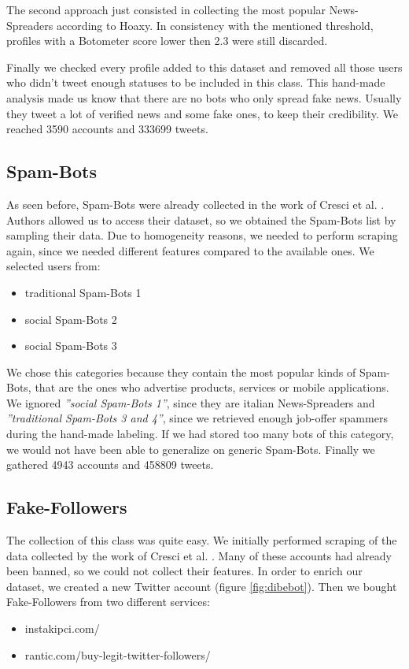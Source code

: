 The second approach just consisted in collecting the most popular News-Spreaders according to Hoaxy. In consistency with the mentioned threshold, profiles with a Botometer score lower then 2.3 were still discarded.

Finally we checked every profile added to this dataset and removed all those users who didn't tweet enough statuses to be included in this class. This hand-made analysis made us know that there are no bots who only spread fake news. Usually they tweet a lot of verified news and some fake ones, to keep their credibility.
We reached 3590 accounts and 333699 tweets.

\subsection{Spam-Bots}
As seen before, Spam-Bots were already collected in the work of Cresci et al. \cite{Cresci}. Authors allowed us to access their dataset, so we obtained the Spam-Bots list by sampling their data. Due to homogeneity reasons, we needed to perform scraping again, since we needed different features compared to the available ones.
We selected users from:
\begin{itemize}
	\item[\PencilRight]traditional Spam-Bots 1
	\item[\PencilRight]social Spam-Bots 2
	\item[\PencilRight]social Spam-Bots 3
\end{itemize}

We chose this categories because they contain the most popular kinds of Spam-Bots, that are the ones who advertise products, services or mobile applications. We ignored \emph{''social Spam-Bots 1''}, since they are italian News-Spreaders and \emph{''traditional Spam-Bots 3 and 4''}, since we retrieved enough job-offer spammers during the hand-made labeling. If we had stored too many bots of this category, we would not have been able to generalize on generic Spam-Bots. Finally we gathered 4943 accounts and 458809 tweets.

\subsection{Fake-Followers}
The collection of this class was quite easy. We initially performed scraping of the data collected by the work of Cresci et al. \cite{Cresci}. Many of these accounts had already been banned, so we could not collect their features. In order to enrich our dataset, we created a new Twitter account (figure \ref{fig:dibebot}). Then we bought Fake-Followers from two different services:
\begin{itemize}
	\item[\PencilRight] instakipci.com/
	\item[\PencilRight] rantic.com/buy-legit-twitter-followers/
\end{itemize}

